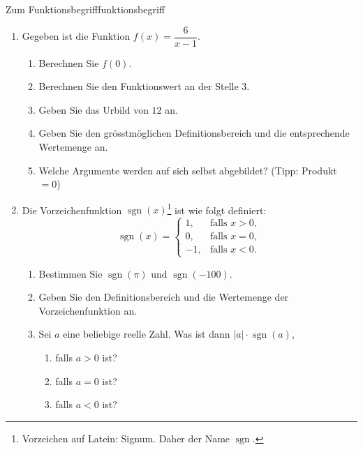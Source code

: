 \begin{ueb}
    {Zum Funktionsbegriff}{funktionsbegriff}
    \begin{enumerate}
        \item Gegeben ist die Funktion \(f(x)=\dfrac{6}{x-1}\).

              \begin{enumerate}
                  \item Berechnen Sie \(f(0)\).
                  \item Berechnen Sie den Funktionswert an der Stelle \(3\).
                  \item Geben Sie das Urbild von \(12\) an.
                  \item Geben Sie den grösstmöglichen Definitionsbereich und die entsprechende Wertemenge an.
                  \item Welche Argumente werden auf sich selbst abgebildet?
                        (Tipp: Produkt \(=0\))
              \end{enumerate}

        \item Die Vorzeichenfunktion \(\operatorname{sgn}(x)\)\footnote{Vorzeichen auf Latein: Signum. Daher der Name \(\operatorname{sgn}.\)} ist wie folgt definiert:
              \[
                  \operatorname{sgn}(x)=
                  \begin{cases}
                      1,  & \text{falls } x>0, \\
                      0,  & \text{falls } x=0, \\
                      -1, & \text{falls } x<0.
                  \end{cases}
              \]

              \begin{enumerate}
                  \item Bestimmen Sie \(\operatorname{sgn}(\pi)\) und
                        \(\operatorname{sgn}(-100)\).
                  \item Geben Sie den Definitionsbereich und die Wertemenge
                        der Vorzeichenfunktion an.
                  \item Sei \(a\) eine beliebige reelle Zahl.
                        Was ist dann \(|a|\cdot\operatorname{sgn}(a)\),
                        \begin{enumerate}
                            \item falls \(a>0\) ist?
                            \item falls \(a=0\) ist?
                            \item falls \(a<0\) ist?
                        \end{enumerate}
              \end{enumerate}


\end{enumerate}
\end{ueb}
